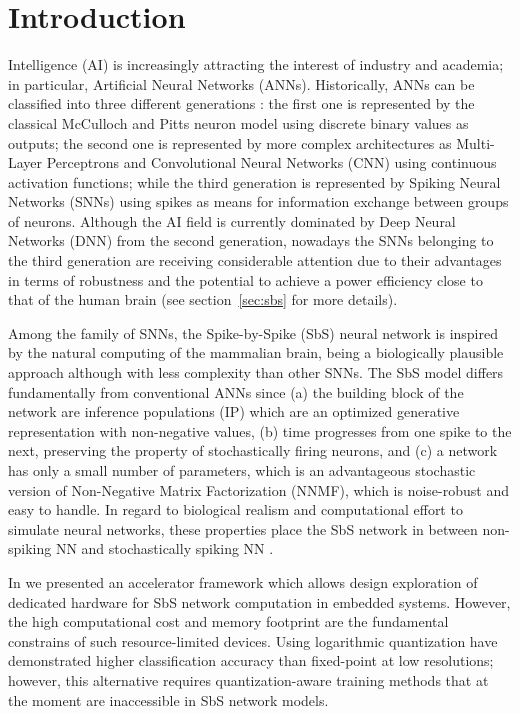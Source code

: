 
\section{Introduction}
\label{sec:introduction}
 Intelligence (AI) is increasingly attracting the interest of industry and academia; in particular,  Artificial Neural Networks (ANNs). Historically, ANNs can be classified into three different generations \cite{Design_Exploration_SbS_Trans20}: the first one is represented by the classical McCulloch and Pitts neuron model using discrete binary values as outputs; the second one is represented by more complex architectures as Multi-Layer Perceptrons and Convolutional Neural Networks (CNN) using continuous activation functions; while the third generation is represented by Spiking Neural Networks (SNNs) using spikes as means for information exchange between groups of neurons. Although the AI field is currently dominated by Deep Neural Networks (DNN) from the second generation, nowadays the SNNs belonging to the third generation are receiving considerable attention \cite{Spinnaker_Trans13,ernst2007efficient,Design_Exploration_SbS_Trans20, SNN_Survey_Trans19} due to their advantages in terms of robustness and the
potential to achieve a power efficiency close to that of the human
brain (see section~\ref{sec:sbs} for more details).

Among the family of SNNs, the Spike-by-Spike (SbS) neural network \cite{ernst2007efficient} is inspired by the natural computing of the mammalian brain, being a biologically plausible approach although with less complexity than other SNNs. The SbS model differs fundamentally from conventional ANNs since (a) the building block of the network are inference populations (IP) which are an optimized generative representation with non-negative values, (b) time progresses from one spike to the next, preserving the property of stochastically firing neurons, and (c) a network has only a small number of parameters, which is an advantageous stochastic version of Non-Negative Matrix Factorization (NNMF), which is noise-robust and easy to handle. In regard to biological realism and computational effort to simulate neural networks, these properties place the SbS network in between non-spiking NN and stochastically spiking NN \cite{rotermund2019Backpropagation}.

In \cite{nevarez2020accelerator} we presented an accelerator framework which allows design exploration of dedicated hardware for SbS network computation in embedded systems. However, the high computational cost and memory footprint are the fundamental constrains of such resource-limited devices. Using logarithmic quantization have demonstrated higher classification accuracy than fixed-point at low resolutions; however, this alternative requires quantization-aware training methods that at the moment are inaccessible in SbS network models.

